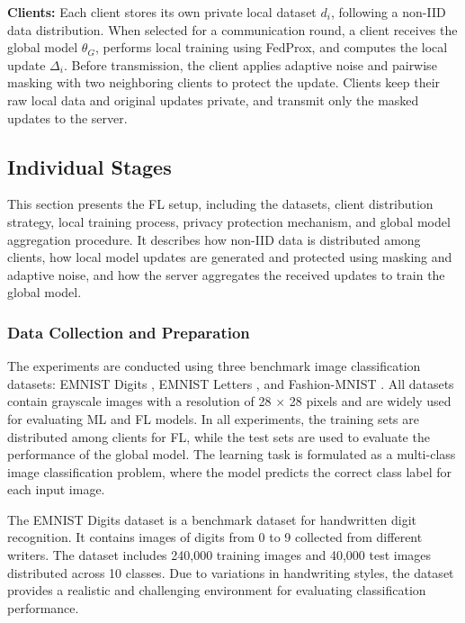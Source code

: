 \documentclass[a4paper,fleqn]{cas-dc}
\begin{document}
\textbf{Clients:} Each client stores its own private local dataset $d_{i}$, following a non-IID data distribution. When selected for a communication round, a client receives the global model $\theta_{G}$, performs local training using FedProx, and computes the local update $\Delta_{i}$. Before transmission, the client applies adaptive noise and pairwise masking with two neighboring clients to protect the update. Clients keep their raw local data and original updates private, and transmit only the masked updates to the server.

\subsection{Individual Stages}

This section presents the FL setup, including the datasets, client distribution strategy, local training process, privacy protection mechanism, and global model aggregation procedure. It describes how non-IID data is distributed among clients, how local model updates are generated and protected using masking and adaptive noise, and how the server aggregates the received updates to train the global model.

\subsubsection{Data Collection and Preparation}
\label{sec:4.2.1}

The experiments are conducted using three benchmark image classification datasets: EMNIST Digits \citep{cohen2017emnist}, EMNIST Letters \citep{cohen2017emnist}, and Fashion-MNIST \citep{xiao2017fashion}. All datasets contain grayscale images with a resolution of 28 $\times$ 28 pixels and are widely used for evaluating ML and FL models. In all experiments, the training sets are distributed among clients for FL, while the test sets are used to evaluate the performance of the global model. The learning task is formulated as a multi-class image classification problem, where the model predicts the correct class label for each input image.

The EMNIST Digits dataset is a benchmark dataset for handwritten digit recognition. It contains images of digits from 0 to 9 collected from different writers. The dataset includes 240,000 training images and 40,000 test images distributed across 10 classes. Due to variations in handwriting styles, the dataset provides a realistic and challenging environment for evaluating classification performance.
\end{document}
